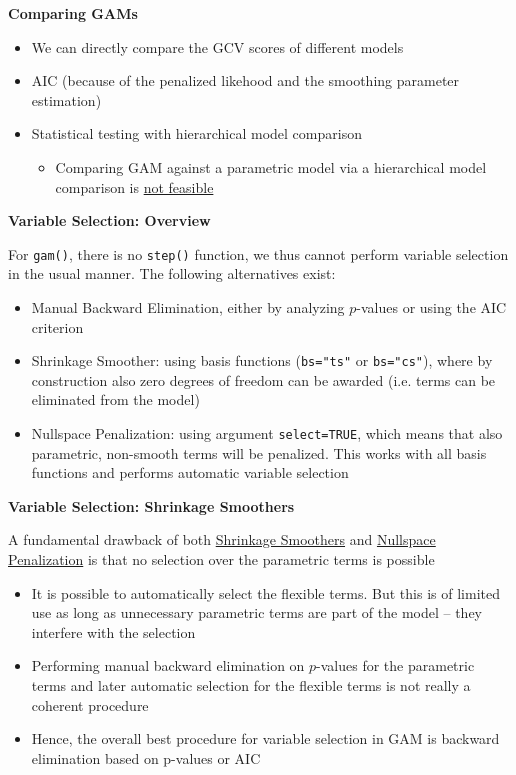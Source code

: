 \documentclass[a4paper]{article}
\begin{document}
\textbf{Comparing GAMs}
\begin{itemize}
    \item We can directly compare the GCV scores of different models
    \item AIC (because of the penalized likehood and the smoothing parameter estimation)
    \item Statistical testing with hierarchical model comparison
    \begin{itemize}
        \item Comparing GAM against a parametric model via a hierarchical model comparison is \underline{not feasible}
    \end{itemize}
\end{itemize}

\textbf{Variable Selection: Overview}

For \texttt{gam()}, there is no \texttt{step()} function, we thus cannot perform variable selection in the usual manner. The following alternatives exist:
\begin{itemize}
    \item Manual Backward Elimination, either by analyzing $p$-values or using the AIC criterion
    \item Shrinkage Smoother: using basis functions (\texttt{bs="ts"} or \texttt{bs="cs"}), where by construction also zero degrees of freedom can be awarded (i.e. terms can be eliminated from the model)
    \item Nullspace Penalization: using argument \texttt{select=TRUE}, which means that also parametric, non-smooth terms will be penalized. This works with all basis functions and performs automatic variable selection
\end{itemize}

\textbf{Variable Selection: Shrinkage Smoothers}

A fundamental drawback of both \underline{Shrinkage Smoothers} and \underline{Nullspace Penalization} is that no selection over the parametric terms is possible
\begin{itemize}
    \item It is possible to automatically select the flexible terms. But this is of limited use as long as unnecessary parametric terms are part of the model – they interfere with the selection
    \item Performing manual backward elimination on $p$-values for the parametric terms and later automatic selection for the flexible terms is not really a coherent procedure
    \item Hence, the overall best procedure for variable selection in GAM is backward elimination based on p-values or AIC
\end{itemize}
\end{document}
